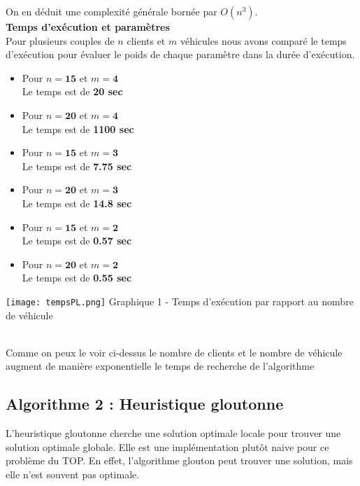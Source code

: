 \documentclass[a4paper, 12pt, DIV=12]{scrartcl}
\begin{document}
On en déduit une complexité générale bornée par $O(n^3)$. \\[10pt]

\textbf{Temps d'exécution et paramètres} \\[5pt]
Pour plusieurs couples de $n$ clients et $m$ véhicules nous avons comparé le temps d'exécution pour évaluer le poids de chaque paramètre dans la durée d'exécution. 
\begin{itemize}
    \item Pour $n = \textbf{15}$ et $m = \textbf{4}$ \\
            Le temps est de \textbf{20 sec}
    \item Pour $n = \textbf{20}$ et $m = \textbf{4}$ \\
            Le temps est de \textbf{1100 sec}
     \item Pour $n = \textbf{15}$ et $m = \textbf{3}$ \\
            Le temps est de \textbf{7.75 sec}
    \item Pour $n = \textbf{20}$ et $m = \textbf{3}$ \\
            Le temps est de \textbf{14.8 sec}
    \item Pour $n = \textbf{15}$ et $m = \textbf{2}$ \\
            Le temps est de \textbf{0.57 sec}
    \item Pour $n = \textbf{20}$ et $m = \textbf{2}$ \\
            Le temps est de \textbf{0.55 sec}
\end{itemize} 

\begin{center}
    \texttt{[image: tempsPL.png]}
    Graphique 1 - Temps d'exécution par rapport au nombre de véhicule
\end{center}\\[10pt]

Comme on peux le voir ci-dessus le nombre de clients et le nombre de véhicule augment de manière exponentielle le temps de recherche de l'algorithme
\newpage
\subsection{Algorithme 2 : Heuristique gloutonne}
L'heuristique gloutonne cherche une solution optimale locale pour trouver une solution optimale globale. Elle est une implémentation plutôt naive pour ce problème du TOP. En effet, l'algorithme glouton peut trouver une solution, mais elle n'est souvent pas optimale. 
\end{document}
